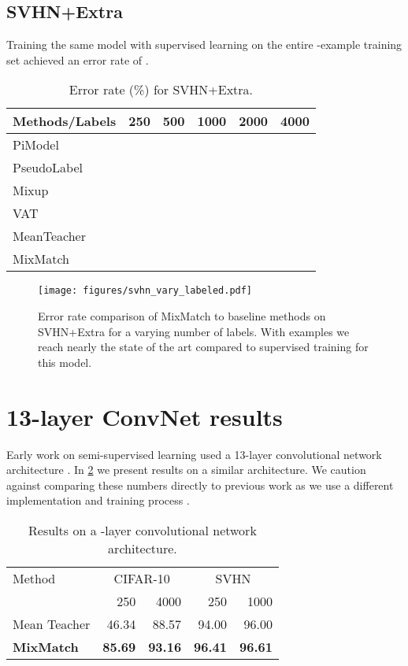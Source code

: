 \documentclass{article}
\begin{document}
\subsection{SVHN+Extra}
Training the same model with supervised learning on the entire -example training set achieved an error rate of .
\begin{table}[H]
\centering
\begin{tabular}{lrrrrr}
\toprule
Methods/Labels & 250 & 500 & 1000 & 2000 & 4000 \\
\midrule
PiModel &  &  &  &  &  \\
PseudoLabel &  &  &  &  &  \\
Mixup &  &  &  &  &  \\
VAT &  &  &  &  &  \\
MeanTeacher &  &  &  &  &  \\
MixMatch &  &  &  &  &  \\
\bottomrule
\end{tabular}
\vskip 0.1in
\caption{Error rate (\%) for SVHN+Extra.}
\label{tab:svhn_extra}
\end{table}

\begin{figure}[H]
    \centering
    \texttt{[image: figures/svhn\_vary\_labeled.pdf]}
    \caption{Error rate comparison of MixMatch to baseline methods on SVHN+Extra for
    a varying number of labels. With  examples we reach nearly the state of the art compared to supervised training for this model.}
    \label{fig:vary_svhn_extra}
\end{figure}

\section{13-layer ConvNet results}

Early work on semi-supervised learning used a 13-layer convolutional network architecture \cite{miyato2018virtual,tarvainen2017weight,laine2016temporal}.
In \cref{tab:conv13} we present results on a similar architecture.
We caution against comparing these numbers directly to previous work as we use a different implementation and training process \cite{oliver2018realistic}.

\begin{table}[H]
\footnotesize
\begin{center}
\begin{tabular}{lrrrr}
\toprule
Method & \multicolumn{2}{c}{CIFAR-10} & \multicolumn{2}{c}{SVHN} \\
& 250 & 4000 & 250 & 1000 \\ 
\midrule
Mean Teacher & 46.34 & 88.57 &94.00 &96.00 \\
\textbf{MixMatch} & \textbf{85.69} & \textbf{93.16} & \textbf{96.41} & \textbf{96.61} \\
\bottomrule
\end{tabular}
\end{center}
\caption{Results on a -layer convolutional network architecture.}\label{tab:conv13}
\end{table}
\end{document}
